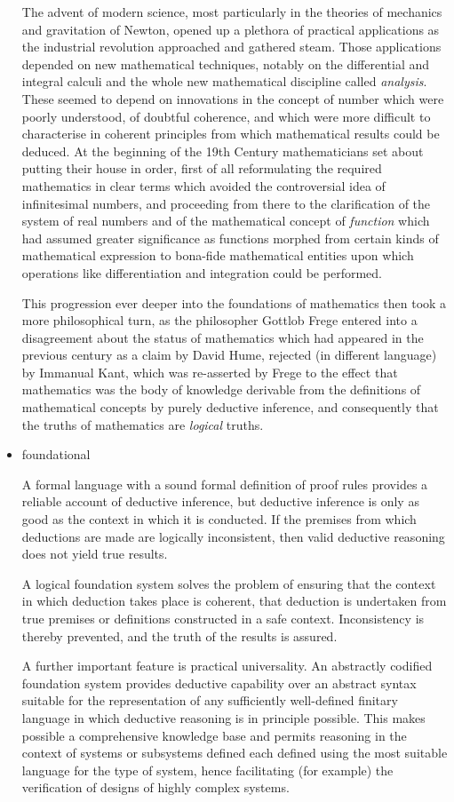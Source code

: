 \documentclass[10pt,titlepage]{book}
\begin{document}
\begin{itemize}
  The advent of modern science, most particularly in the theories of mechanics and gravitation of Newton, opened up a plethora of practical applications as the industrial revolution approached and gathered steam.
  Those applications depended on new mathematical techniques, notably on the differential and integral calculi and the whole new mathematical discipline called \emph{analysis}.
  These seemed to depend on innovations in the concept of number which were poorly understood, of doubtful coherence, and which were more difficult to characterise in coherent principles from which mathematical results could be deduced.
  At the beginning of the 19th Century mathematicians set about putting their house in order, first of all reformulating the required mathematics in clear terms which avoided the controversial idea of infinitesimal numbers, and proceeding from there to the clarification of the system of real numbers and of the mathematical concept of \emph{function} which had assumed greater significance as functions morphed from certain kinds of mathematical expression to bona-fide mathematical entities upon which operations like differentiation and integration could be performed.

  This progression ever deeper into the foundations of mathematics then took a more philosophical turn, as the philosopher Gottlob Frege entered into a disagreement about the status of mathematics which had appeared in the previous century as a claim by David Hume, rejected (in different language) by Immanual Kant, which was re-asserted by Frege to the effect that mathematics was the body of knowledge derivable from the definitions of mathematical concepts by purely deductive inference, and consequently that the truths of mathematics are \emph{logical} truths.
  
\item foundational

  A formal language with a sound formal definition of proof rules provides a reliable account of deductive inference, but deductive inference is only as good as the context in which it is conducted.
  If the premises from which deductions are made are logically inconsistent, then valid deductive reasoning does not yield true results.

  A logical foundation system solves the problem of ensuring that the context in which deduction takes place is coherent, that deduction is undertaken from true premises or definitions constructed in a safe context.
  Inconsistency is thereby prevented, and the truth of the results is assured.

  A further important feature is practical universality.
  An abstractly codified foundation system provides deductive capability over an abstract syntax suitable for the representation of any sufficiently well-defined finitary language in which deductive reasoning is in principle possible.
  This makes possible a comprehensive knowledge base and permits reasoning in the context of systems or subsystems defined each defined using the most suitable language for the type of system, hence facilitating (for example) the verification of designs of highly complex systems.
  
\end{itemize}
\end{document}
